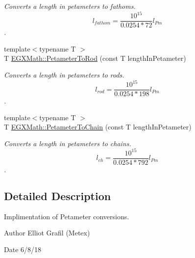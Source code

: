 \begin{DoxyCompactItemize}
\begin{DoxyCompactList}\small\item\em Converts a length in petameters to fathoms. \[ l_{fathom}= \frac{10^{15}}{0.0254 * 72} l_{Pm} \]. \end{DoxyCompactList}\item 
{\footnotesize template$<$typename T $>$ }\\T \mbox{\hyperlink{group___e_g_x_math-_conversions-_length_conversions-_s_i-_petameter-_surveyors_gae7cef029bdb3e7ace9aa08e0183cc202}{E\+G\+X\+Math\+::\+Petameter\+To\+Rod}} (const T length\+In\+Petameter)
\begin{DoxyCompactList}\small\item\em Converts a length in petameters to rods. \[ l_{rod}= \frac{10^{15}}{0.0254 * 198} l_{Pm} \]. \end{DoxyCompactList}\item 
{\footnotesize template$<$typename T $>$ }\\T \mbox{\hyperlink{group___e_g_x_math-_conversions-_length_conversions-_s_i-_petameter-_surveyors_ga2d17d0bd003489d3d72d4ed1a2bd2f97}{E\+G\+X\+Math\+::\+Petameter\+To\+Chain}} (const T length\+In\+Petameter)
\begin{DoxyCompactList}\small\item\em Converts a length in petameters to chains. \[ l_{ch}= \frac{10^{15}}{0.0254 * 792} l_{Pm} \]. \end{DoxyCompactList}\end{DoxyCompactItemize}


\subsection{Detailed Description}
Implimentation of Petameter conversions. 

\begin{DoxyAuthor}{Author}
Elliot Grafil (Metex) 
\end{DoxyAuthor}
\begin{DoxyDate}{Date}
6/8/18 
\end{DoxyDate}
